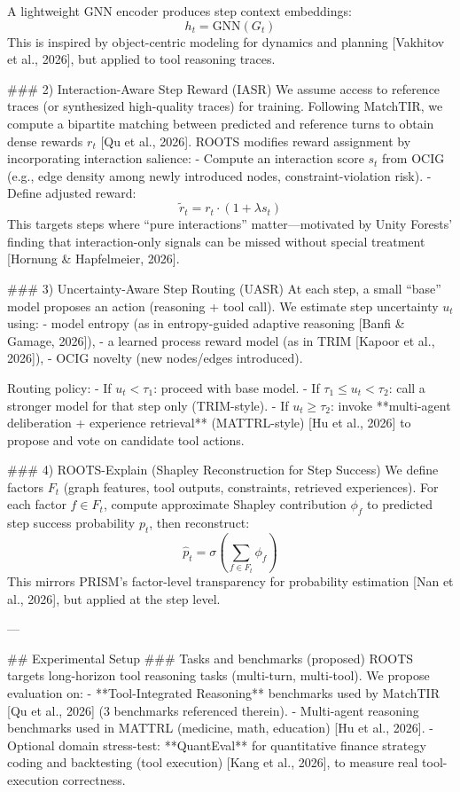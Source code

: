 A lightweight GNN encoder produces step context embeddings:
\[
h_t = \text{GNN}(G_t)
\]
This is inspired by object-centric modeling for dynamics and planning [Vakhitov et al., 2026], but applied to tool reasoning traces.

### 2) Interaction-Aware Step Reward (IASR)
We assume access to reference traces (or synthesized high-quality traces) for training. Following MatchTIR, we compute a bipartite matching between predicted and reference turns to obtain dense rewards \(r_t\) [Qu et al., 2026]. ROOTS modifies reward assignment by incorporating interaction salience:
- Compute an interaction score \(s_t\) from OCIG (e.g., edge density among newly introduced nodes, constraint-violation risk).
- Define adjusted reward:
\[
\tilde r_t = r_t \cdot (1+\lambda s_t)
\]
This targets steps where “pure interactions” matter—motivated by Unity Forests’ finding that interaction-only signals can be missed without special treatment [Hornung & Hapfelmeier, 2026].

### 3) Uncertainty-Aware Step Routing (UASR)
At each step, a small “base” model proposes an action (reasoning + tool call). We estimate step uncertainty \(u_t\) using:
- model entropy (as in entropy-guided adaptive reasoning [Banfi & Gamage, 2026]),
- a learned process reward model (as in TRIM [Kapoor et al., 2026]),
- OCIG novelty (new nodes/edges introduced).

Routing policy:
- If \(u_t < \tau_1\): proceed with base model.
- If \(\tau_1 \le u_t < \tau_2\): call a stronger model for that step only (TRIM-style).
- If \(u_t \ge \tau_2\): invoke **multi-agent deliberation + experience retrieval** (MATTRL-style) [Hu et al., 2026] to propose and vote on candidate tool actions.

### 4) ROOTS-Explain (Shapley Reconstruction for Step Success)
We define factors \(F_t\) (graph features, tool outputs, constraints, retrieved experiences). For each factor \(f \in F_t\), compute approximate Shapley contribution \(\phi_f\) to predicted step success probability \(p_t\), then reconstruct:
\[
\hat p_t = \sigma\left(\sum_{f\in F_t} \phi_f\right)
\]
This mirrors PRISM’s factor-level transparency for probability estimation [Nan et al., 2026], but applied at the step level.

---

## Experimental Setup
### Tasks and benchmarks (proposed)
ROOTS targets long-horizon tool reasoning tasks (multi-turn, multi-tool). We propose evaluation on:
- **Tool-Integrated Reasoning** benchmarks used by MatchTIR [Qu et al., 2026] (3 benchmarks referenced therein).
- Multi-agent reasoning benchmarks used in MATTRL (medicine, math, education) [Hu et al., 2026].
- Optional domain stress-test: **QuantEval** for quantitative finance strategy coding and backtesting (tool execution) [Kang et al., 2026], to measure real tool-execution correctness.

